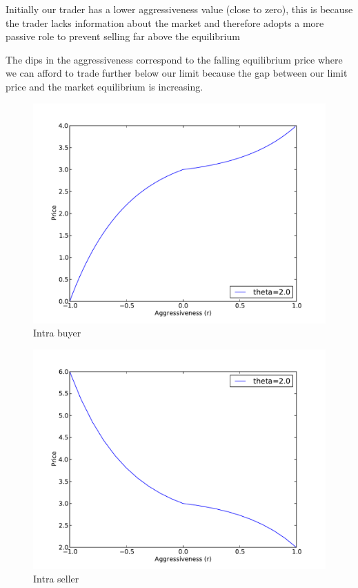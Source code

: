 \documentclass[preprint]{acm_proc_article-sp} %
\begin{document}
Initially our trader has a lower aggressiveness value (close to zero), this is
because the trader lacks information about the market and therefore adopts a
more passive role to prevent selling far above the equilibrium

The dips in the aggressiveness correspond to the falling equilibrium price
where we can afford to trade further below our limit because the gap between
our limit price and the market equilibrium is increasing.

\begin{figure} 
\centering
\includegraphics[width=\columnwidth]{graphs_and_stats/graph_intra_buyer.pdf}
\caption{Intra buyer}
\end{figure}

\begin{figure} 
\centering
\includegraphics[width=\columnwidth]{graphs_and_stats/graph_intra_seller.pdf}
\caption{Intra seller}
\end{figure}
\end{document}
